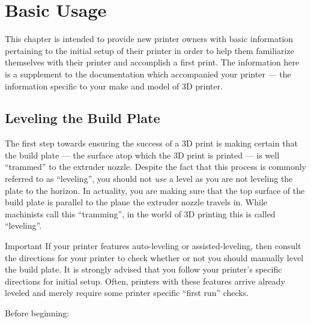 
\chapter{Basic Usage} \label{chap:basic_usage}

This chapter is intended to provide new printer owners with basic information pertaining to the initial setup of their printer in order to help them familiarize themselves with their printer and accomplish a first print.  The information here is a supplement to the documentation which accompanied your printer --- the information specific to your make and model of 3D printer.


\section{Leveling the Build Plate} \label{sec:leveling}

The first step towards ensuring the success of a 3D print is making certain that the build plate --- the surface atop which the 3D print is printed --- is well ``trammed'' to the extruder nozzle.  Despite the fact that this process is commonly referred to as ``leveling'', you should not \emph{use} a level as you are not leveling the plate to the horizon.  In actuality, you are making sure that the top surface of the build plate is parallel to the plane the extruder nozzle travels in.  While machinists call this ``tramming'', in the world of 3D printing this is called ``leveling''.

\begin{bclogo}[logo=\bcattention, noborder=true, couleurBarre=red]{Important}
If your printer features auto-leveling or assisted-leveling, then consult the directions for your printer to check whether or not you should manually level the build plate.  It is strongly advised that you follow your printer's specific directions for initial setup.  Often, printers with these features arrive already leveled and merely require some printer specific ``first run'' checks.
\end{bclogo}

Before beginning:

